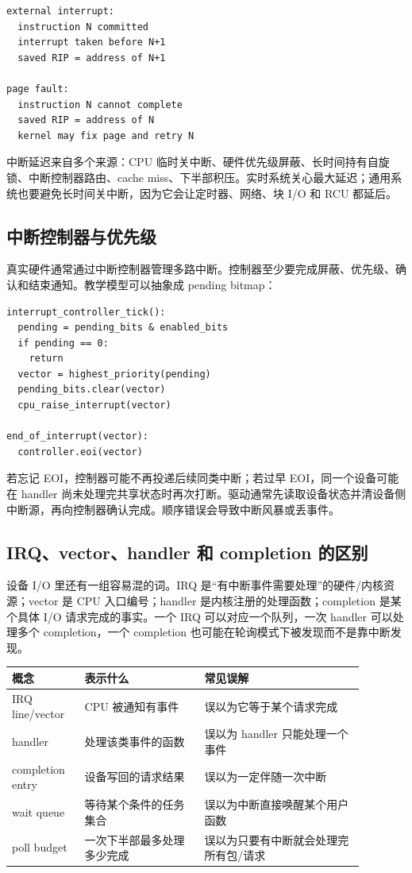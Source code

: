 \begin{lstlisting}
external interrupt:
  instruction N committed
  interrupt taken before N+1
  saved RIP = address of N+1

page fault:
  instruction N cannot complete
  saved RIP = address of N
  kernel may fix page and retry N
\end{lstlisting}

中断延迟来自多个来源：CPU 临时关中断、硬件优先级屏蔽、长时间持有自旋锁、中断控制器路由、cache miss、下半部积压。实时系统关心最大延迟；通用系统也要避免长时间关中断，因为它会让定时器、网络、块 I/O 和 RCU 都延后。

\subsection{中断控制器与优先级}

真实硬件通常通过中断控制器管理多路中断。控制器至少要完成屏蔽、优先级、确认和结束通知。教学模型可以抽象成 pending bitmap：

\begin{lstlisting}
interrupt_controller_tick():
  pending = pending_bits & enabled_bits
  if pending == 0:
    return
  vector = highest_priority(pending)
  pending_bits.clear(vector)
  cpu_raise_interrupt(vector)

end_of_interrupt(vector):
  controller.eoi(vector)
\end{lstlisting}

若忘记 EOI，控制器可能不再投递后续同类中断；若过早 EOI，同一个设备可能在 handler 尚未处理完共享状态时再次打断。驱动通常先读取设备状态并清设备侧中断源，再向控制器确认完成。顺序错误会导致中断风暴或丢事件。

\subsection{IRQ、vector、handler 和 completion 的区别}

设备 I/O 里还有一组容易混的词。IRQ 是“有中断事件需要处理”的硬件/内核资源；vector 是 CPU 入口编号；handler 是内核注册的处理函数；completion 是某个具体 I/O 请求完成的事实。一个 IRQ 可以对应一个队列，一次 handler 可以处理多个 completion，一个 completion 也可能在轮询模式下被发现而不是靠中断发现。

\begin{longtable}{p{0.18\linewidth}p{0.30\linewidth}p{0.40\linewidth}}
\toprule
概念 & 表示什么 & 常见误解 \\
\midrule
IRQ line/vector & CPU 被通知有事件 & 误以为它等于某个请求完成 \\
handler & 处理该类事件的函数 & 误以为 handler 只能处理一个事件 \\
completion entry & 设备写回的请求结果 & 误以为一定伴随一次中断 \\
wait queue & 等待某个条件的任务集合 & 误以为中断直接唤醒某个用户函数 \\
poll budget & 一次下半部最多处理多少完成 & 误以为只要有中断就会处理完所有包/请求 \\
\bottomrule
\end{longtable}

